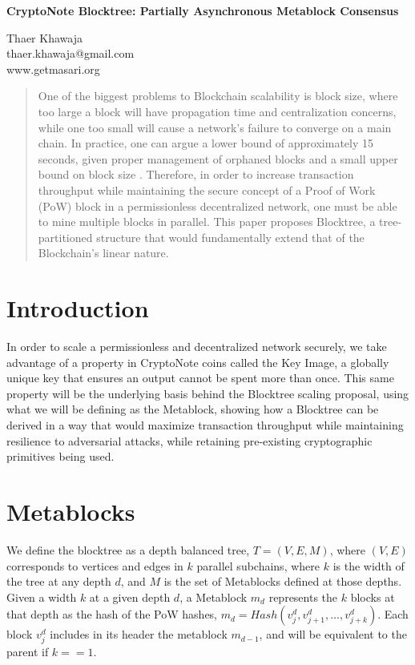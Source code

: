 \documentclass{article}
\begin{document}
\begin{center}
  \textbf{CryptoNote Blocktree: Partially Asynchronous Metablock Consensus}\\
  \vspace{5mm}

  {\small
    Thaer Khawaja\\
    thaer.khawaja@gmail.com\\
    www.getmasari.org\\
  }
  \vspace{5mm}
\end{center}

\begin{abstract}
One of the biggest problems to Blockchain scalability is block size, where too large a block will have propagation time and centralization concerns, while one too small will cause a network's failure to converge on a main chain. In practice, one can argue a lower bound of approximately 15 seconds, given proper management of orphaned blocks and a small upper bound on block size \cite{khawaja}. Therefore, in order to increase transaction throughput while maintaining the secure concept of a Proof of Work (PoW) block in a permissionless decentralized network, one must be able to mine multiple blocks in parallel. This paper proposes Blocktree, a tree-partitioned structure that would fundamentally extend that of the Blockchain's linear nature.
\end{abstract}
\section{Introduction}
In order to scale a permissionless and decentralized network securely, we take advantage of a property in CryptoNote coins called the Key Image, a globally unique key that ensures an output cannot be spent more than once\cite{saberhagen}. This same property will be the underlying basis behind the Blocktree scaling proposal, using what we will be defining as the Metablock, showing how a Blocktree can be derived in a way that would maximize transaction throughput while maintaining resilience to adversarial attacks, while retaining pre-existing cryptographic primitives being used.
\section{Metablocks}
We define the blocktree as a depth balanced tree, $T = (V, E, M)$, where $(V,E)$ corresponds to vertices and edges in $k$ parallel subchains, where $k$ is the width of the tree at any depth $d$, and $M$ is the set of Metablocks defined at those depths. Given a width $k$ at a given depth $d$, a Metablock $m_d$ represents the $k$ blocks at that depth as the hash of the PoW hashes, $m_d = Hash(v_j^d,v_{j + 1}^d,\ldots,v_{j+k}^d)$. Each block $v_{j}^{d}$ includes in its header the metablock $m_{d-1}$, and will be equivalent to the parent if $k == 1$.
\end{document}
